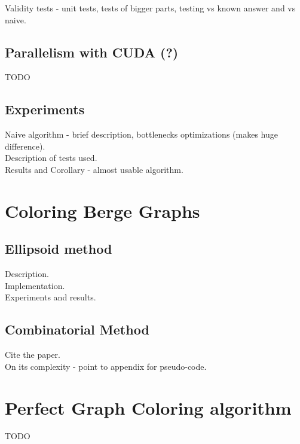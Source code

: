\documentclass{article}
\begin{document}
Validity tests - unit tests, tests of bigger parts, testing vs known answer and vs naive.

\subsection{Parallelism with CUDA (?)}

TODO

\subsection{Experiments}

Naive algorithm - brief description, bottlenecks optimizations (makes huge difference).\\

Description of tests used.\\

Results and Corollary - almost usable algorithm.



\section{Coloring Berge Graphs}

\subsection{Ellipsoid method}

Description.\\

Implementation.\\

Experiments and results.\\

\subsection{Combinatorial Method}

Cite the paper.\\

On its complexity - point to appendix for pseudo-code.

\appendix
\appendixpage
\addappheadtotoc

\section{Perfect Graph Coloring algorithm}
TODO


% 
\printbibliography
\end{document}
